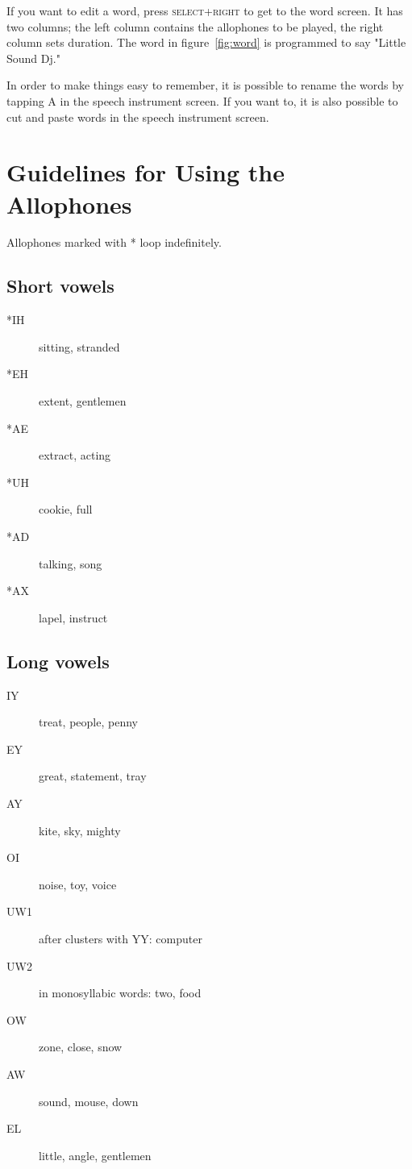 		If you want to edit a word, press \textsc{select+right} to get to the word screen. It has two columns; the left column contains the allophones to be played, the right column sets duration. The word in figure~\ref{fig:word} is programmed to say "Little Sound Dj."

		In order to make things easy to remember, it is possible to rename the words by tapping A in the speech instrument screen. If you want to, it is also possible to cut and paste words in the speech instrument screen.

\section{Guidelines for Using the Allophones}

Allophones marked with * loop indefinitely.

\subsection{Short vowels}

\begin{description}
\item[*IH] sitting, stranded
\item[*EH] extent, gentlemen
\item[*AE] extract, acting
\item[*UH] cookie, full
\item[*AD] talking, song
\item[*AX] lapel, instruct
\end{description}

\subsection{Long vowels}

\begin{description}
\item[IY] treat, people, penny
\item[EY] great, statement, tray
\item[AY] kite, sky, mighty
\item[OI] noise, toy, voice
\item[UW1] after clusters with YY: computer
\item[UW2] in monosyllabic words: two, food
\item[OW] zone, close, snow
\item[AW] sound, mouse, down
\item[EL] little, angle, gentlemen
\end{description}

